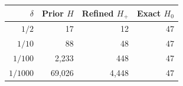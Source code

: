 \begin{tabular}{rrrr}
\toprule
$\delta$ & Prior $H$ & Refined $H_+$ & Exact $H_0$\\
\midrule
$1/2$ & 17 & 12 & 47\\
$1/10$ & 88 & 48 & 47\\
$1/100$ & 2,233 & 448 & 47\\
$1/1000$ & 69,026 & 4,448 & 47\\
\bottomrule
\end{tabular}
